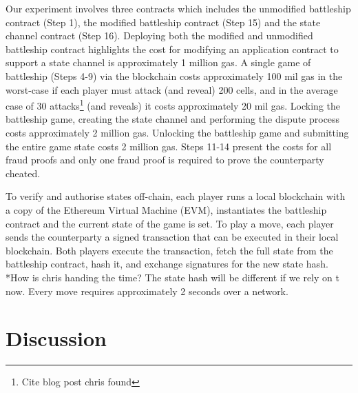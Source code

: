 \documentclass{llncs}
\begin{document}
Our experiment involves three contracts which includes the unmodified battleship contract (Step 1), the modified battleship contract (Step 15) and the state channel contract (Step 16). 
Deploying both the modified and unmodified battleship contract highlights the cost for modifying an application contract to support a state channel is approximately 1 million gas. 
A single game of battleship (Steps 4-9) via the blockchain costs approximately 100 mil gas in the worst-case if each player must attack (and reveal) 200 cells, and in the average case of 30 attacks\footnote{Cite blog post chris found} (and reveals) it costs approximately 20 mil gas. 
Locking the battleship game, creating the state channel and performing the dispute process costs approximately 2 million gas.
Unlocking the battleship game and submitting the entire game state costs 2 million gas. 
Steps 11-14 present the costs for all fraud proofs and only one fraud proof is required to prove the counterparty cheated. 

To verify and authorise states off-chain, each player runs a local blockchain with a copy of the Ethereum Virtual Machine (EVM), instantiates the battleship contract and the current state of the game is set. 
To play a move, each player sends the counterparty a signed transaction that can be executed in their local blockchain. 
Both players execute the transaction, fetch the full state from the battleship contract, hash it, and exchange signatures for the new state hash. 
*How is chris handing the time? The state hash will be different if we rely on t now. 
Every move requires approximately 2 seconds over a network. 


\section{Discussion} 

\end{document}
